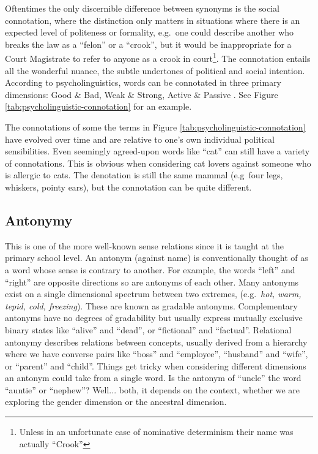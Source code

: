 Oftentimes the only discernible difference between synonyms is the social connotation, where the distinction only matters in situations where there is an expected level of politeness or formality, e.g.\ one could describe another who breaks the law as a ``felon'' or a ``crook'', but it would be inappropriate for a Court Magistrate to refer to anyone as a crook in court\footnote{Unless in an unfortunate case of nominative determinism their name was actually ``Crook''}. The connotation entails all the wonderful nuance, the subtle undertones of political and social intention. According to psycholinguistics, words can be connotated in three primary dimensions: Good \& Bad, Weak \& Strong, Active \& Passive \cite{osgood1957measurement}. See Figure \ref{tab:psycholinguistic-connotation} for an example.

The connotations of some the terms in Figure \ref{tab:psycholinguistic-connotation} have evolved over time and are relative to one's own individual political sensibilities. Even seemingly agreed-upon words like ``cat'' can still have a variety of connotations. This is obvious when considering cat lovers against someone who is allergic to cats. The denotation is still the same mammal (e.g\ four legs, whiskers, pointy ears), but the connotation can be quite different.


\subsection{Antonymy}
This is one of the more well-known sense relations since it is taught at the primary school level. An antonym (against name) is conventionally thought of as a word whose sense is contrary to another. For example, the words ``left'' and ``right'' are opposite directions so are antonyms of each other. Many antonyms exist on a single dimensional spectrum between two extremes, (e.g.\ \textit{hot, warm, tepid, cold, freezing}). These are known as gradable antonyms. Complementary antonyms have no degrees of gradability but usually express mutually exclusive binary states like ``alive'' and ``dead'', or ``fictional'' and ``factual''. Relational antonymy describes relations between concepts, usually derived from a hierarchy where we have converse pairs like ``boss'' and ``employee'', ``husband'' and ``wife'', or ``parent'' and ``child''. Things get tricky when considering different dimensions an antonym could take from a single word. Is the antonym of ``uncle'' the word ``auntie'' or ``nephew''? Well... both, it depends on the context, whether we are exploring the gender dimension or the ancestral dimension. 

